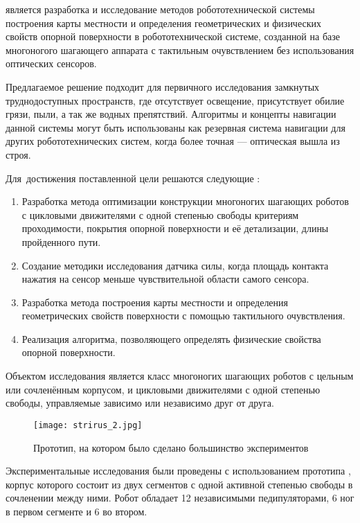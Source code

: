 {\aim} является разработка и исследование методов робототехнической системы построения карты местности и определения геометрических и физических свойств опорной поверхности в робототехнической системе, созданной на  базе многоногого шагающего аппарата с тактильным очувствлением без использования оптических сенсоров.

Предлагаемое решение подходит для первичного исследования замкнутых труднодоступных пространств, где отсутствует освещение, присутствует обилие грязи, пыли, а так же водных препятствий. Алгоритмы и концепты навигации данной системы могут быть использованы как резервная система навигации для других робототехнических систем, когда более точная --- оптическая вышла из строя.

Для~достижения поставленной цели решаются следующие {\tasks}:
\begin{enumerate}[beginpenalty=10000] %
    \item Разработка метода оптимизации конструкции многоногих шагающих роботов с цикловыми движителями с одной степенью свободы критериям проходимости, покрытия опорной поверхности и её детализации, длины пройденного пути.
    \item Создание методики исследования датчика силы, когда площадь контакта нажатия на сенсор меньше чувствительной области самого сенсора.
  \item  Разработка метода построения карты местности и определения геометрических свойств поверхности с помощью тактильного очувствления.
  \item Реализация алгоритма, позволяющего определять физические свойства опорной поверхности.
\end{enumerate}

{\researchobj}
Объектом исследования является класс многоногих шагающих роботов с цельным или сочленённым корпусом, и цикловыми движителями с одной степенью свободы, управляемые зависимо или независимо друг от друга.

\begin{figure}[H]
  \centering\texttt{[image: strirus\_2.jpg]}
  \caption{Прототип, на котором было сделано большинство экспериментов}
  \label{fig:strirus_2.jpgg}
\end{figure}

Экспериментальные исследования были проведены с использованием прототипа , корпус которого состоит из двух сегментов с одной активной степенью свободы в сочленении между ними. Робот обладает 12 независимыми педипуляторами, 6 ног в первом сегменте и 6 во втором.

